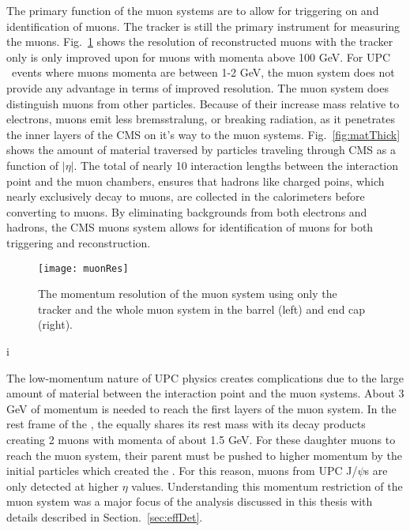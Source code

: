     The primary function of the muon systems are to allow for triggering on and
      identification of muons.
    The tracker is still the primary instrument for measuring the muons. 
    Fig.~\ref{fig:muonRes} shows the resolution of reconstructed muons with 
      the tracker only is only improved upon for muons with momenta above 
      100 GeV. 
    For UPC \JPsi{}~events where muons momenta are between 1-2 GeV, the muon
      system does not provide any advantage in terms of improved resolution.
    The muon system does distinguish muons from other particles.
    Because of their increase mass relative to electrons, muons emit less 
      bremsstralung, or breaking radiation, as it penetrates the inner layers
      of the CMS on it's way to the muon systems.
    Fig.~\ref{fig:matThick} shows the amount of material traversed by particles
      traveling through CMS as a function of $|\eta|$.
    The total of nearly 10 interaction lengths between the interaction point 
      and the muon chambers, ensures that hadrons like charged poins, which
      nearly exclusively decay to muons, are collected in the calorimeters 
      before converting to muons. 
    By eliminating backgrounds from both electrons and hadrons, the CMS muons 
      system allows for identification of muons for both triggering and 
      reconstruction.
  
    \begin{figure}[!Hhbt]
      \centering
      \texttt{[image: muonRes]}
      \caption{ The momentum resolution of the muon system using only the 
        tracker and the whole muon system in the barrel (left) and end cap 
        (right).}
      \label{fig:muonRes}
    \end{figure}i

    The low-momentum nature of UPC physics creates complications due to the 
      large amount of material between the interaction point and the muon 
      systems.
    About 3 GeV of momentum is needed to reach the first layers of the muon 
      system.
    In the rest frame of the \JPsi{}, the \JPsi{} equally shares its rest mass with 
      its decay products creating 2 muons with momenta of about 1.5 GeV.
    For these daughter muons to reach the muon system, their parent \JPsi{} must
      be pushed to higher momentum by the initial particles which created the
      \JPsi{}.
    For this reason, muons from UPC J/$\psi$s are only detected at higher 
      $\eta$ values.
    Understanding this momentum restriction of the muon system was a major 
      focus of the analysis discussed in this thesis with details described in 
      Section.~\ref{sec:effDet}.


